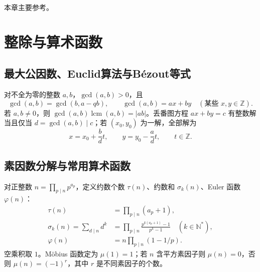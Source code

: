 \documentclass[../main.tex]{subfiles}
\begin{document}
本章主要参考\cite{shoup,dlmf,lte}。

\section{整除与算术函数}
\subsection{最大公因数、Euclid算法与Bézout等式}
对不全为零的整数 $a,b$，$\gcd(a,b)>0$，且
\[
\gcd(a,b)=\gcd(b,a-qb),\qquad
\gcd(a,b)=ax+by\quad(\text{某些 }x,y\in\mathbb Z).
\]
若 $a,b\ne0$，则 $\gcd(a,b)\operatorname{lcm}(a,b)=|ab|$。丢番图方程 $ax+by=c$ 有整数解当且仅当 $d=\gcd(a,b)\mid c$；若 $(x_0,y_0)$ 为一解，全部解为
\[
x=x_0+\frac bd t,\qquad y=y_0-\frac ad t,\qquad t\in\mathbb Z.
\]
\subsection{素因数分解与常用算术函数}
对正整数 $n=\prod_{p\mid n}p^{a_p}$，定义约数个数 $\tau(n)$、约数和 $\sigma_k(n)$、Euler 函数 $\varphi(n)$：
\begin{align*}
\tau(n)&=\prod_{p\mid n}(a_p+1),\\
\sigma_k(n)=\sum_{d\mid n}d^k&=\prod_{p\mid n}\frac{p^{k(a_p+1)}-1}{p^k-1}\quad(k\in\mathbb N^*),\\
\varphi(n)&=n\prod_{p\mid n}(1-1/p).
\end{align*}
空乘积取 $1$。Möbius 函数定为 $\mu(1)=1$；若 $n$ 含平方素因子则 $\mu(n)=0$，否则 $\mu(n)=(-1)^r$，其中 $r$ 是不同素因子的个数。
\end{document}
